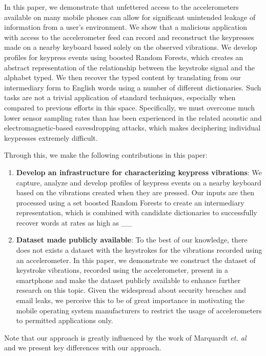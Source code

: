 \documentclass{acm_proc_article-sp}
\begin{document}
In this paper, we demonstrate that unfettered access to the
accelerometers available on many mobile phones can allow for significant
unintended leakage of information from a user's environment.
We show that a malicious application with access to the accelerometer
feed can record and reconstruct the keypresses made
on a nearby keyboard based solely on the observed vibrations. We
develop profiles for keypress events using boosted Random Forests,
which creates an abstract representation of the relationship between
the keystroke signal and the alphabet typed. We then recover the typed content
by translating from our intermediary form to English words using a number
of different dictionaries. Such tasks are not a trivial application of
standard techniques, especially when compared to previous efforts
in this space. Specifically, we must overcome much lower sensor
sampling rates than has been experienced in the related acoustic
and electromagnetic-based eavesdropping attacks, which makes
deciphering individual keypresses extremely difficult.

Through this, we make the following contributions in this paper:
\begin{enumerate}
\item {\bf Develop an infrastructure for characterizing keypress vibrations}: We
capture, analyze and develop profiles of keypress events on a nearby
keyboard based on the vibrations created when they are pressed. Our inputs are
then processed using a set boosted Random Forests to create an intermediary
representation, which is combined with candidate dictionaries
to successfully recover words at rates as high as \_\_ %
\item {\bf Dataset made publicly available}: To the best of our knowledge,
there does not exists a dataset with
the keystrokes for the vibrations recorded using an accelerometer. In this
paper, we demonstrate we construct the dataset of keystroke vibrations,
recorded using the accelerometer, present in a smartphone and make
the dataset publicly available to enhance further research on this topic. Given
the widespread about security breaches and email leaks, we perceive this to be
of great importance in motivating the mobile operating system manufacturers
to restrict the usage of accelerometers to permitted applications only.\\
\end{enumerate}
\noindent Note that our approach is greatly influenced by the work of
Marquardt \emph{et. al}~\cite{spiphone} and we present key differences with our
approach.
\end{document}
